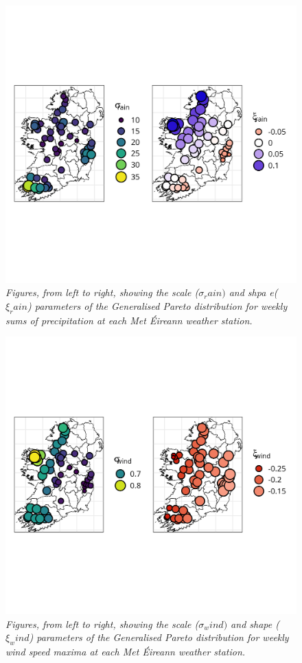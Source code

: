\documentclass{article}
\numberwithin{equation}{section}
\begin{document}

\begin{figure}[H]
    \centering
    \includegraphics[width = 0.9\linewidth]{plots/032_gpd_rain.png}
    \caption{\emph{Figures, from left to right, showing the scale ($\sigma_rain)$ and shpa e($\xi_rain$) parameters of the Generalised Pareto distribution for weekly sums of precipitation at each Met Éireann weather station.}}
    \label{fig:03_gpd_rain}
\end{figure}

\begin{figure}[H]
    \centering
    \includegraphics[width = 0.9\linewidth]{plots/033_gpd_ws.png}
    \caption{\emph{Figures, from left to right, showing the scale ($\sigma_wind)$ and shape ($\xi_wind$) parameters of the Generalised Pareto distribution for weekly wind speed maxima at each Met Éireann weather station.}}
    \label{fig:03_gpd_ws}
\end{figure}
\end{document}
